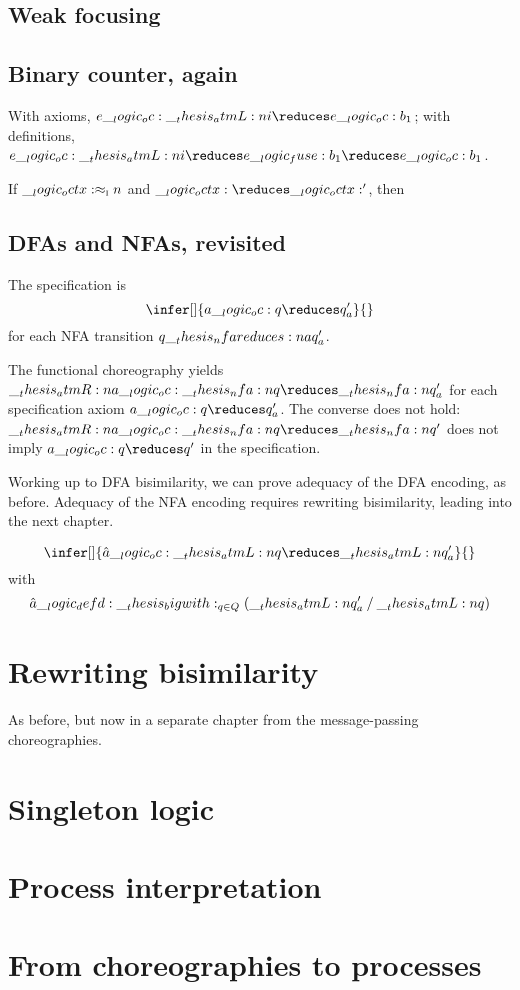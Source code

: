 \subsection{Weak focusing}

\subsection{Binary counter, again}

With axioms, $e \oc \atmL{i} \reduces e \oc b_1$; with definitions, $e \oc \atmL{i} \reduces e \fuse b_1 \reduces e \oc b_1$.

If $\__logic_octx: \approx\sb{\text{\normalfont\scshape i}} n$ and $\octx \reduces \octx'$, then 


\subsection{\Acp*{DFA} and \acp*{NFA}, revisited}

The specification is 
\begin{equation*}
  \infer[]{a \oc q \reduces q'_a}{}
\end{equation*}
for each \ac{NFA} transition $q \nfareduces[a] q'_a$.

The functional choreography yields $\atmR{a} \oc \nfa{q} \reduces \nfa{q}'_a$ for each specification axiom $a \oc q \reduces q'_a$.
The converse does not hold: $\atmR{a} \oc \nfa{q} \reduces \nfa{q}'$ does not imply $a \oc q \reduces q'$ in the specification.

Working up to \ac{DFA} bisimilarity, we can prove adequacy of the \ac{DFA} encoding, as before.
Adequacy of the \ac{NFA} encoding requires rewriting bisimilarity, leading into the next chapter.


\begin{equation*}
  \infer[]{\hat{a} \oc \atmL{q} \reduces \atmL{q}'_a}{}
\end{equation*}
with
\begin{equation*}
  \hat{a} \__logic_defd: \__thesis_bigwith:_{q \in Q}(\__thesis_atmL:n {q}'_a \mathbin { / } \__thesis_atmL:n {q})
\end{equation*}


\section{Rewriting bisimilarity}

As before, but now in a separate chapter from the message-passing choreographies.


\section{Singleton logic}

\section{Process interpretation}

\section{From choreographies to processes}



